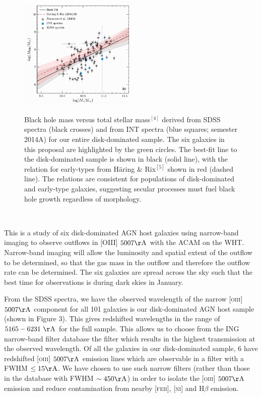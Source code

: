 \documentclass[12pt]{article}
\begin{document}
\begin{figure} [h]
\includegraphics[width=0.5\textwidth]{fig2_r.pdf} \\
\caption{Black hole mass versus total stellar mass$^{[4]}$ derived from SDSS spectra (black crosses) and from INT spectra (blue squares; semester 2014A) for our entire disk-dominated sample. The six galaxies in this proposal are highlighted by the green circles. The best-fit line to the disk-dominated sample is shown in black (solid line), with the relation for early-types from Häring \& Rix$^{[5]}$ shown in red (dashed line). The relations are consistent for populations of disk-dominated and early-type galaxies, suggesting secular processes must fuel black hole growth regardless of morphology.}
\end{figure}


\\




This is a study of six disk-dominated AGN host galaxies using narrow-band imaging to observe outflows in \textsc{[OIII]} $5007\rm{\AA}$ with the ACAM on the WHT. Narrow-band imaging will allow the luminosity and spatial extent of the outflow to be determined, so that the gas mass in the outflow and therefore the outflow rate can be determined. The six galaxies are spread across the sky such that the best time for observations is during dark skies in January.
\vspace{0.25em}

From the SDSS spectra, we have the observed  wavelength of the narrow \textsc{[oiii]} $5007\rm{\AA}$ component for all 101 galaxies is our disk-dominated AGN host sample (shown in Figure 3). This gives redshifted wavelengths in the range of $5165-6231~\rm{\AA}$ for the full sample. This allows us to choose from the ING narrow-band filter database the filter which results in the highest transmission at the observed wavelength. Of all the galaxies in our disk-dominated sample, 6 have redshifted \textsc{[oiii]} $5007\rm{\AA}$ emission lines which are observable in a filter with a FWHM $\leq15\rm{\AA}$. We have chosen to use such narrow filters (rather than those in the database with FWHM $\sim450\rm{\AA}$) in order to isolate the \textsc{[oiii]} $5007\rm{\AA}$ emission and reduce contamination from nearby \textsc{[feii]}, \textsc{[ni]} and H$\beta$ emission. 
\vspace{0.25em}
\end{document}
